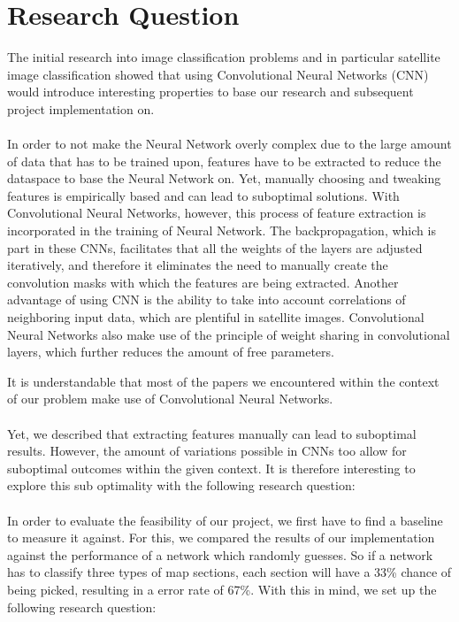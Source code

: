\documentclass[a4paper,onecolumn]{report}
\begin{document}
\chapter{Research Question}
The initial research into image classification problems and in particular satellite image classification showed that using Convolutional Neural Networks (CNN) would introduce interesting properties to base our research and subsequent project implementation on.\\
\\
In order to not make the Neural Network overly complex due to the large amount of data that has to be trained upon, features have to be extracted to reduce the dataspace to base the Neural Network on. Yet, manually choosing and tweaking features is empirically based and can lead to suboptimal solutions. With Convolutional Neural Networks, however, this process of feature extraction is incorporated in the training of Neural Network. The backpropagation, which is part in these CNNs, facilitates that all the weights of the layers are adjusted iteratively, and therefore it eliminates the need to manually create the convolution masks with which the features are being extracted. Another advantage of using CNN is the ability to take into account correlations of neighboring input data, which are plentiful in satellite images. Convolutional Neural Networks also make use of the principle of weight sharing in convolutional layers, which further reduces the amount of free parameters.

It is understandable that most of the papers we encountered within the context of our problem make use of Convolutional Neural Networks.\\
\\
Yet, we described that extracting features manually can lead to suboptimal results. However, the amount of variations possible in CNNs too allow for suboptimal outcomes within the given context. It is therefore interesting to explore this sub optimality with the following research question:\\


\\
\label{chap:researchquestion}
In order to evaluate the feasibility of our project, we first have to find a baseline to measure it against. For this, we compared the results of our implementation against the performance of a network which randomly guesses. So if a network has to classify three types of map sections, each section will have a 33\% chance of being picked, resulting in a error rate of 67\%. With this in mind, we set up the following research question: \\ \\
\end{document}
